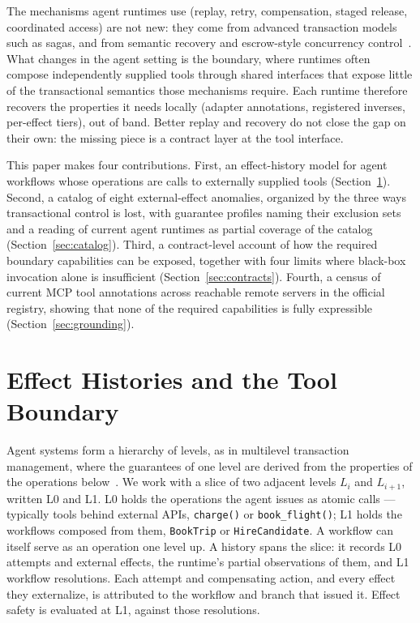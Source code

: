 \documentclass[runningheads]{comsis3}
\begin{document}
The mechanisms agent runtimes use (replay, retry, compensation, staged release, coordinated access) are not new: they come from advanced
transaction models such as sagas, and from semantic recovery and
escrow-style concurrency
control~\cite{garcia1987sagas,korth1990formal,elmagarmid1992transaction,weikum2001transactional,oneil1986escrow}.
What changes in the agent setting is the boundary, where runtimes often
compose independently supplied tools through shared interfaces that expose
little of the transactional semantics those mechanisms require. Each runtime
therefore recovers the properties it needs locally (adapter annotations, registered inverses, per-effect tiers), out of band. Better replay and recovery do not close the gap on their
own: the missing piece is a contract layer at the tool interface.

This paper makes four contributions. First, an effect-history model for
agent workflows whose operations are calls to externally supplied tools
(Section~\ref{sec:model}). Second, a catalog of eight external-effect
anomalies, organized by the three ways transactional control is lost, with
guarantee profiles naming their exclusion sets and a reading of current agent
runtimes as partial coverage of the catalog (Section~\ref{sec:catalog}).
Third, a contract-level account of how the required boundary capabilities
can be exposed, together with four limits where black-box invocation alone is
insufficient (Section~\ref{sec:contracts}). Fourth, a census of current MCP tool
annotations across reachable remote servers in the official registry, showing that none of the required capabilities
is fully expressible (Section~\ref{sec:grounding}).

\section{Effect Histories and the Tool Boundary}
\label{sec:model}

Agent systems form a hierarchy of levels, as in multilevel transaction
management, where the guarantees of one level are derived from the properties of
the operations below~\cite{weikum1991principles}. We work with a slice of
two adjacent levels $L_i$ and $L_{i+1}$, written L0 and L1. L0 holds the
operations the agent issues as atomic calls --- typically tools behind
external APIs, \texttt{charge()} or \texttt{book\_flight()}; L1 holds the
workflows composed from them, \texttt{BookTrip} or \texttt{HireCandidate}.
A workflow can itself serve as an operation one level up. A history spans the
slice: it records L0 attempts and external effects, the runtime's partial
observations of them, and L1 workflow resolutions. Each attempt and
compensating action, and every effect they externalize, is attributed to the
workflow and branch that issued it. Effect safety is evaluated at L1, against
those resolutions.
\end{document}
